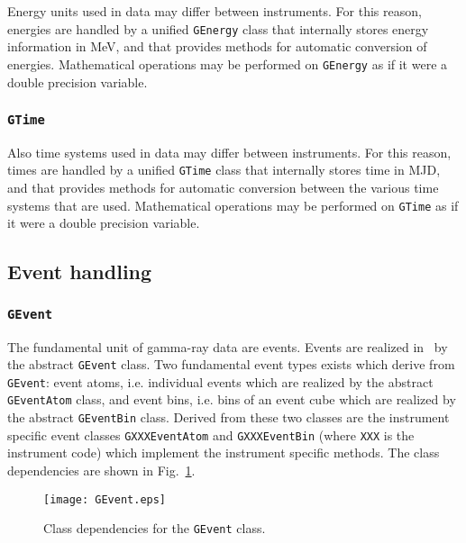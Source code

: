 \documentclass{article}[12pt,a4]
\begin{document}
Energy units used in data may differ between instruments.
For this reason, energies are handled by a unified {\tt GEnergy} class that internally
stores energy information in MeV, and that provides methods for automatic conversion
of energies.
Mathematical operations may be performed on {\tt GEnergy} as if it were a double
precision variable.


\subsubsection{{\tt GTime}}

Also time systems used in data may differ between instruments.
For this reason, times are handled by a unified {\tt GTime} class that internally stores
time in MJD, and that provides methods for automatic conversion between the various
time systems that are used.
Mathematical operations may be performed on {\tt GTime} as if it were a double
precision variable.


\subsection{Event handling}

\subsubsection{{\tt GEvent}}

The fundamental unit of gamma-ray data are events.
Events are realized in \this\ by the abstract {\tt GEvent} class.
Two fundamental event types exists which derive from {\tt GEvent}:
event atoms, i.e. individual events which are realized by the abstract {\tt GEventAtom} class, and
event bins, i.e. bins of an event cube which are realized by the abstract {\tt GEventBin} class.
Derived from these two classes are the instrument specific event classes
{\tt GXXXEventAtom} and {\tt GXXXEventBin} (where {\tt XXX} is the instrument code)
which implement the instrument specific methods.
The class dependencies are shown in Fig.~\ref{fig:GEvent}.
%
%
\begin{figure}[!h]
\centering
\texttt{[image: GEvent.eps]}
\caption{Class dependencies for the {\tt GEvent} class.}
\label{fig:GEvent}
\end{figure}
%
\end{document}
